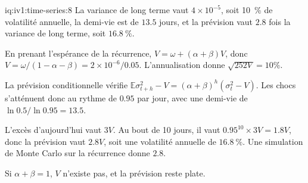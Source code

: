 \begin{solution}{iq:iv1:time-series:8}
La variance de long terme vaut $4 \times 10^{-5}$, soit 10~\% de volatilité annuelle, la demi-vie est de $13.5$ jours, et la prévision vaut $2.8$ fois la variance de long terme, soit $16.8~\%$.

En prenant l'espérance de la récurrence, $V = \omega + (\alpha + \beta)V$, donc $V = \omega/(1 - \alpha - \beta) = 2 \times 10^{-6}/0.05$. L'annualisation donne $\sqrt{252V} = 10\%$.

La prévision conditionnelle vérifie $\mathbb{E}\sigma_{t + h}^2 - V = (\alpha + \beta)^h(\sigma_t^2 - V)$. Les chocs s'atténuent donc au rythme de $0.95$ par jour, avec une demi-vie de $\ln 0.5/\ln 0.95 = 13.5$.

L'excès d'aujourd'hui vaut $3V$. Au bout de 10 jours, il vaut $0.95^{10} \times 3V = 1.8V$, donc la prévision vaut $2.8V$, soit une volatilité annuelle de $16.8~\%$. Une simulation de Monte Carlo sur la récurrence donne $2.8$.

Si $\alpha + \beta = 1$, $V$ n'existe pas, et la prévision reste plate.



\end{solution}

